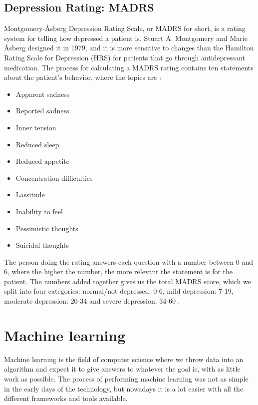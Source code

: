 \subsection{Depression Rating: MADRS} %
Montgomery-Åsberg Depression Rating Scale, or MADRS for short, is a rating system for telling how depressed a patient is. Stuart A. Montgomery and Marie Åsberg 
designed it in 1979, and it is more sensitive to changes than the Hamilton Rating Scale for Depression (HRS) for patients that go through antidepressant medication. 
The process for calculating a MADRS rating contains ten statements about the patient's behavior, where the topics are \cite{madrs_paper}:

\begin{itemize}
    \item Apparent sadness
    \item Reported sadness
    \item Inner tension
    \item Reduced sleep
    \item Reduced appetite
    \item Concentration difficulties
    \item Lassitude
    \item Inability to feel
    \item Pessimistic thoughts
    \item Suicidal thoughts
\end{itemize}

The person doing the rating answers each question with a number between 0 and 6, where the higher the number, the more relevant the statement is for the patient. 
The numbers added together gives us the total MADRS score, which we split into four categories: normal/not depressed: 0-6, mild depression: 7-19, moderate depression: 
20-34 and severe depression: 34-60 \cite{sunnybrook_stroke_study}. 

\newpage
\section{Machine learning}
Machine learning is the field of computer science where we throw data into an algorithm and expect it to give answers to whatever the goal is, 
with as little work as possible. The process of performing machine learning was not as simple in the early days of the technology, 
but nowadays it is a lot easier with all the different frameworks and tools available.

